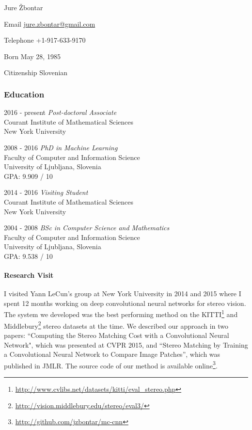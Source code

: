 \documentclass[12pt,a4paper]{article}
\begin{document}
\begin{cv}{Jure \v{Z}bontar}

\begin{cvlist}{}
\item[Email] \href{mailto:jure.zbontar@gmail.com}{jure.zbontar@gmail.com}
\item[Telephone] +1-917-633-9170
\item[Born] May 28, 1985
\item[Citizenship] Slovenian

\end{cvlist}

\subsubsection*{Education}
\begin{cvlist}{}

\item[2016 - present] \emph{Post-doctoral Associate} \\
Courant Institute of Mathematical Sciences \\
New York University

\item[2008 - 2016] \emph{PhD in Machine Learning} \\
Faculty of Computer and Information Science \\
University of Ljubljana, Slovenia \\
GPA: 9.909 / 10

\item[2014 - 2016] \emph{Visiting Student} \\
Courant Institute of Mathematical Sciences \\
New York University

\item[2004 - 2008] \emph{BSc in Computer Science and Mathematics} \\
Faculty of Computer and Information Science \\
University of Ljubljana, Slovenia \\
GPA: 9.538 / 10

\end{cvlist}

\paragraph{Research Visit}
I visited Yann LeCun's group at New York University in 2014 and 2015 where I
spent 12 months working on deep convolutional neural networks for stereo
vision. The system we developed was the best performing method on the
KITTI\footnote{\url{http://www.cvlibs.net/datasets/kitti/eval_stereo.php}} and
Middlebury\footnote{\url{http://vision.middlebury.edu/stereo/eval3/}} stereo
datasets at the time. We described our approach in two papers: ``Computing the
Stereo Matching Cost with a Convolutional Neural Network", which was presented
at CVPR 2015, and ``Stereo Matching by Training a Convolutional Neural Network
to Compare Image Patches'', which was published in JMLR. The source code of our
method is available online\footnote{\url{http://github.com/jzbontar/mc-cnn}}.


\end{cv}
\end{document}
